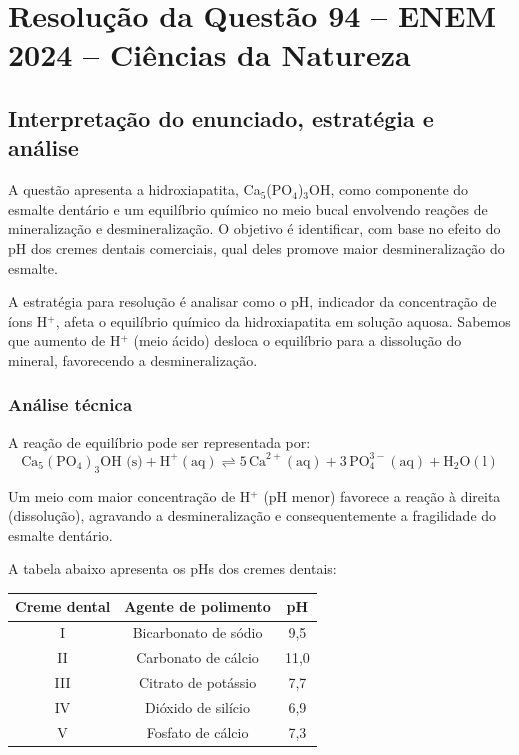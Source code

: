 \documentclass{article}
\begin{document}
\section*{Resolução da Questão 94 -- ENEM 2024 -- Ciências da Natureza}

\subsection*{Interpretação do enunciado, estratégia e análise}
A questão apresenta a hidroxiapatita, Ca$_5$(PO$_4$)$_3$OH, como componente do esmalte dentário e um equilíbrio químico no meio bucal envolvendo reações de mineralização e desmineralização. O objetivo é identificar, com base no efeito do pH dos cremes dentais comerciais, qual deles promove maior desmineralização do esmalte.

A estratégia para resolução é analisar como o pH, indicador da concentração de íons H$^{+}$, afeta o equilíbrio químico da hidroxiapatita em solução aquosa. Sabemos que aumento de H$^{+}$ (meio ácido) desloca o equilíbrio para a dissolução do mineral, favorecendo a desmineralização.

\subsubsection*{Análise técnica}
A reação de equilíbrio pode ser representada por:
\[
\text{Ca}_5(\text{PO}_4)_3\text{OH (s)} + \text{H}^+ (\text{aq}) \rightleftharpoons 5\,\text{Ca}^{2+} (\text{aq}) + 3\,\text{PO}_4^{3-} (\text{aq}) + \text{H}_2\text{O} (\text{l})
\]

Um meio com maior concentração de H$^{+}$ (pH menor) favorece a reação à direita (dissolução), agravando a desmineralização e consequentemente a fragilidade do esmalte dentário.

A tabela abaixo apresenta os pHs dos cremes dentais:

\begin{center}
\begin{tabular}{|c|c|c|}
\hline
\textbf{Creme dental} & \textbf{Agente de polimento} & \textbf{pH} \\
\hline
I & Bicarbonato de sódio & 9,5 \\
II & Carbonato de cálcio & 11,0 \\
III & Citrato de potássio & 7,7 \\
IV & Dióxido de silício & 6,9 \\
V & Fosfato de cálcio & 7,3 \\
\hline
\end{tabular}
\end{center}
\end{document}
